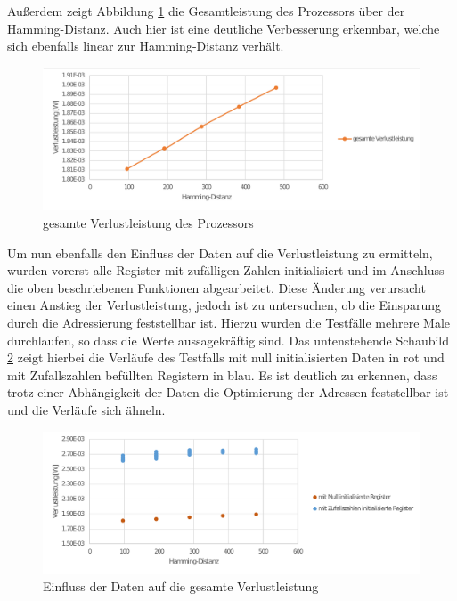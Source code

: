 Außerdem zeigt Abbildung \ref{fig:total_power_source_target} die Gesamtleistung des Prozessors über der Hamming-Distanz. Auch hier ist eine deutliche Verbesserung erkennbar, welche sich ebenfalls linear zur Hamming-Distanz verhält.

\begin{figure}[H]
	\centering
	\includegraphics[width=\textwidth]{fig/total_power_source_target.pdf}
	\caption{gesamte Verlustleistung des Prozessors}
	\label{fig:total_power_source_target}
\end{figure}

Um nun ebenfalls den Einfluss der Daten auf die Verlustleistung zu ermitteln, wurden vorerst alle Register mit zufälligen Zahlen initialisiert und im Anschluss die oben beschriebenen Funktionen abgearbeitet. Diese Änderung verursacht einen Anstieg der Verlustleistung, jedoch ist zu untersuchen, ob die Einsparung durch die Adressierung feststellbar ist. Hierzu wurden die Testfälle mehrere Male durchlaufen, so dass die Werte aussagekräftig sind. Das untenstehende Schaubild \ref{fig:random_data_total_power} zeigt hierbei die Verläufe des Testfalls mit null initialisierten Daten in rot und mit Zufallszahlen befüllten Registern in blau. Es ist deutlich zu erkennen, dass trotz einer Abhängigkeit der Daten die Optimierung der Adressen feststellbar ist und die Verläufe sich ähneln.

\begin{figure}[H]
	\centering
	\includegraphics[width=\textwidth]{fig/random_data_total_power.pdf}
	\caption{Einfluss der Daten auf die gesamte Verlustleistung}
	\label{fig:random_data_total_power}
\end{figure}


